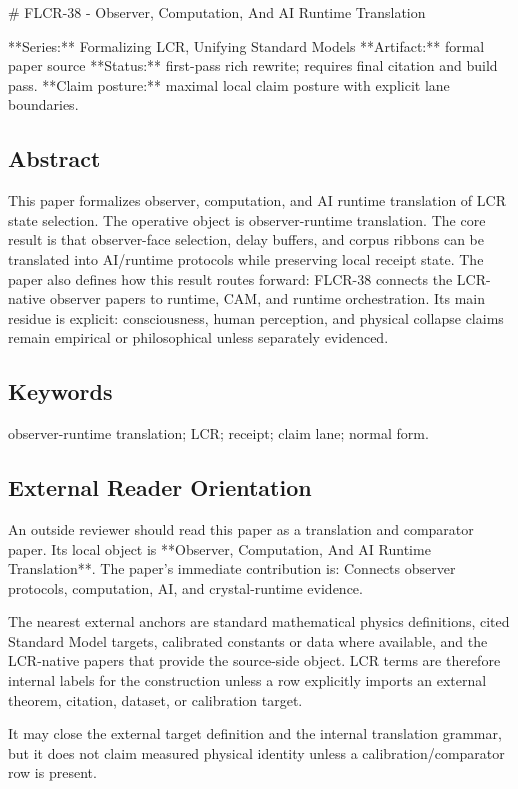 \documentclass[11pt]{article}
\begin{document}
﻿\# FLCR-38 - Observer, Computation, And AI Runtime Translation

**Series:** Formalizing LCR, Unifying Standard Models
**Artifact:** formal paper source
**Status:** first-pass rich rewrite; requires final citation and build pass.
**Claim posture:** maximal local claim posture with explicit lane boundaries.

\subsection*{Abstract}

This paper formalizes observer, computation, and AI runtime translation of LCR state selection. The operative object is observer-runtime translation. The core result is that observer-face selection, delay buffers, and corpus ribbons can be translated into AI/runtime protocols while preserving local receipt state. The paper also defines how this result routes forward: FLCR-38 connects the LCR-native observer papers to runtime, CAM, and runtime orchestration. Its main residue is explicit: consciousness, human perception, and physical collapse claims remain empirical or philosophical unless separately evidenced.

\subsection*{Keywords}

observer-runtime translation; LCR; receipt; claim lane; normal form.

\subsection*{External Reader Orientation}

An outside reviewer should read this paper as a translation and comparator paper. Its local object is **Observer, Computation, And AI Runtime Translation**. The paper's immediate contribution is: Connects observer protocols, computation, AI, and crystal-runtime evidence.

The nearest external anchors are standard mathematical physics definitions, cited Standard Model targets, calibrated constants or data where available, and the LCR-native papers that provide the source-side object. LCR terms are therefore internal labels for the construction unless a row explicitly imports an external theorem, citation, dataset, or calibration target.

It may close the external target definition and the internal translation grammar, but it does not claim measured physical identity unless a calibration/comparator row is present.
\end{document}
